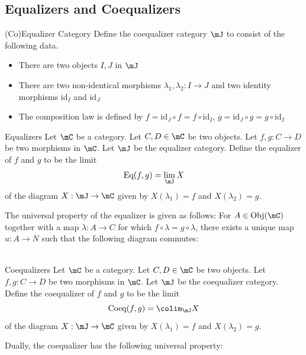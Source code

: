 \documentclass[a4paper]{article}
\begin{document}
\subsection{Equalizers and Coequalizers}
\begin{defn}{(Co)Equalizer Category}{} Define the coequalizer category $\mJ$ to consist of the following data. 
\begin{itemize}
\item There are two objects $I,J$ in $\mJ$
\item There are two non-identical morphisms $\lambda_1,\lambda_2:I\to J$ and two identity morphisms $\text{id}_I$ and $\text{id}_J$
\item The composition law is defined by $f=\text{id}_J\circ f=f\circ\text{id}_I$, $g=\text{id}_J\circ g=g\circ\text{id}_I$
\end{itemize}
\end{defn}

\begin{defn}{Equalizers}{} Let $\mC$ be a category. Let $C,D\in\mC$ be two objects. Let $f,g:C\to D$ be two morphisms in $\mC$. Let $\mJ$ be the equalizer category. Define the equalizer of $f$ and $g$ to be the limit $$\text{Eq}(f,g)=\lim_{\mJ}X$$ of the diagram $X:\mJ\to\mC$ given by $X(\lambda_1)=f$ and $X(\lambda_2)=g$. 
\end{defn}

The universal property of the equalizer is given as follows: For $A\in\text{Obj}(\mC)$ together with a map $\lambda:A\to C$ for which $f\circ\lambda=g\circ\lambda$, there exists a unique map $u:A\to N$ such that the following diagram commutes: \\
\\

\begin{defn}{Coequalizers}{} Let $\mC$ be a category. Let $C,D\in\mC$ be two objects. Let $f,g:C\to D$ be two morphisms in $\mC$. Let $\mJ$ be the coequalizer category. Define the coequalizer of $f$ and $g$ to be the limit $$\text{Coeq}(f,g)=\colim_{\mJ}X$$ of the diagram $X:\mJ\to\mC$ given by $X(\lambda_1)=f$ and $X(\lambda_2)=g$. 
\end{defn}

Dually, the coequalizer has the following universal property: \\
\\
\end{document}
